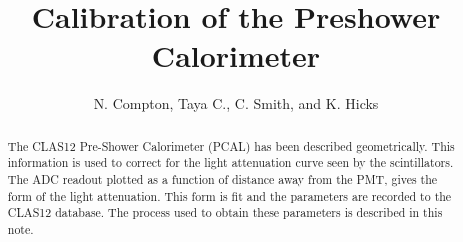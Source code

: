 \documentclass[letterpaper,10pt]{article}
\title{Calibration of the Preshower Calorimeter}
\author{N. Compton, Taya C., C. Smith, and K. Hicks}
\begin{document}
\maketitle

\begin{abstract}
The CLAS12 Pre-Shower Calorimeter (PCAL) has been described geometrically. This information is used to correct 
for the light attenuation curve seen by the scintillators. The ADC readout plotted as a function of distance 
away from the PMT, gives the form of the light attenuation. This form is fit and the parameters are recorded 
to the CLAS12 database. The process used to obtain these parameters is described in this note.
\end{abstract} 


\tableofcontents
\clearpage



%














\end{document}
